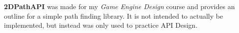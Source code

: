 \label{index_md_2DPathAPI_extradocs_mainpage}%
%
 {\bfseries{2DPath\+API}} was made for my {\itshape Game Engine Design} course and provides an outline for a simple path finding library. It is not intended to actually be implemented, but instead was only used to practice API Design. 